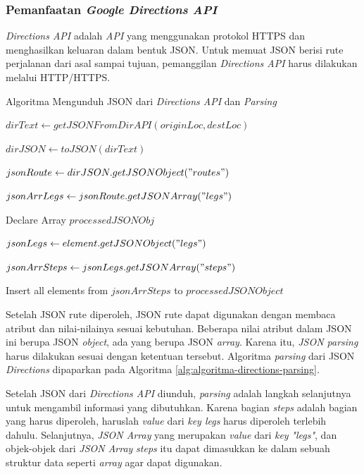 \subsubsection{Pemanfaatan \textit{Google Directions API}}
\textit{Directions API} adalah \textit{API} yang menggunakan protokol HTTPS dan menghasilkan keluaran dalam bentuk JSON. Untuk memuat JSON berisi rute perjalanan dari asal sampai tujuan, pemanggilan \textit{Directions API} harus dilakukan melalui HTTP/HTTPS.

\begin{algorithm}
	\caption{Algoritma Mengunduh JSON dari \textit{Directions API} dan \textit{Parsing}}
	\label{alg:algoritma-directions-parsing}
	\begin{algorithmic}[1]
		\State $dirText \gets getJSONFromDirAPI(originLoc,destLoc)$ 
		
		\State $dirJSON \gets toJSON(dirText)$	
		
		\State $jsonRoute \gets dirJSON.getJSONObject("routes")$
		
		\State $jsonArrLegs \gets jsonRoute.getJSONArray("legs")$

		\State Declare Array $processedJSONObj$		
		
		\State $jsonLegs \gets element.getJSONObject("legs") $

		\State $jsonArrSteps \gets jsonLegs.getJSONArray("steps")$		
		
		\State Insert all elements from $jsonArrSteps$ to $processedJSONObject$ 
		\EndFor
	\EndFunction  
	\end{algorithmic}
\end{algorithm}

Setelah JSON rute diperoleh, JSON rute dapat digunakan dengan membaca atribut dan nilai-nilainya sesuai kebutuhan. Beberapa nilai atribut dalam JSON ini  berupa JSON \textit{object}, ada yang berupa JSON \textit{array}. Karena itu,  \textit{JSON parsing} harus dilakukan sesuai dengan ketentuan tersebut. Algoritma \textit{parsing} dari JSON \textit{Directions} dipaparkan pada Algoritma \ref{alg:algoritma-directions-parsing}. 

Setelah JSON dari \textit{Directions API} diunduh, \textit{parsing} adalah langkah selanjutnya untuk mengambil informasi yang dibutuhkan. Karena bagian \textit{steps} adalah bagian yang harus diperoleh, haruslah \textit{value} dari \textit{key legs} harus diperoleh terlebih dahulu. Selanjutnya, \textit{JSON Array} yang merupakan \textit{value} dari \textit{key} \textit{"legs"}, dan objek-objek dari \textit{JSON Array} \textit{steps} itu dapat dimasukkan ke dalam sebuah struktur data seperti \textit{array} agar dapat digunakan.  


